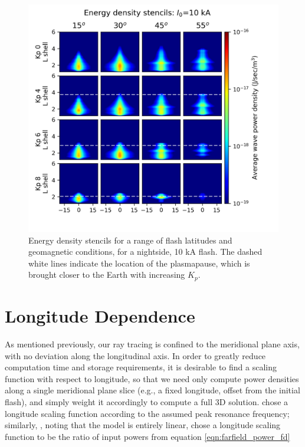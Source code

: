 \begin{figure}[h!]
\begin{center}
\includegraphics{figures/wave_energy_vs_L_stencils.png}
\caption[Energy density stencils]{Energy density stencils for a range of flash latitudes and geomagnetic conditions, for a nightside, 10 kA flash. The dashed white lines indicate the location of the plasmapause, which is brought closer to the Earth with increasing $K_p$.}
\label{fig:energy_stencils}
\end{center}
\end{figure}

\section{Longitude Dependence}
\label{section:longitude_scaling}
As mentioned previously, our ray tracing is confined to the meridional plane axis, with no deviation along the longitudinal axis. In order to greatly reduce computation time and storage requirements, it is desirable to find a scaling function with respect to longitude, so that we need only compute power densities along a single meridional plane slice (e.g., a fixed longitude, offset from the initial flash), and simply weight it accordingly to compute a full 3D solution. \cite{Lauben1998} chose a longitude scaling function according to the assumed peak resonance frequency; similarly, \cite{Bortnik2005}, noting that the model is entirely linear, chose a longitude scaling function to be the ratio of input powers from equation \eqref{eqn:farfield_power_fd}

